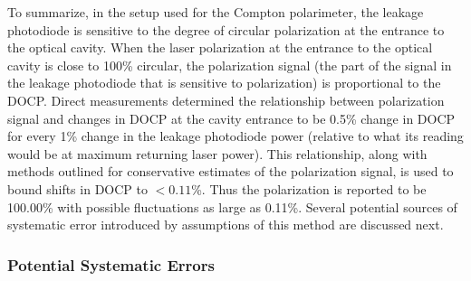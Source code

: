 To summarize, in the setup used for the Compton polarimeter, the leakage photodiode is sensitive to the degree of circular polarization at the entrance to the optical cavity.  When the laser polarization at the entrance to the optical cavity is close to 100\% circular, the polarization signal (the part of the signal in the leakage photodiode that is sensitive to polarization) is proportional to the DOCP. Direct measurements determined the relationship between polarization signal and changes in DOCP at the cavity entrance to be 0.5\% change in DOCP for every 1\% change in the leakage photodiode power (relative to what its reading would be at maximum returning laser power). This relationship, along with methods outlined for conservative estimates of the polarization signal, is used to bound shifts in DOCP to $<0.11$\%. Thus the polarization is reported to be 100.00\% with possible fluctuations as large as 0.11\%. Several potential sources of systematic error introduced by assumptions of this method are discussed next. 

\subsubsection{Potential Systematic Errors}

